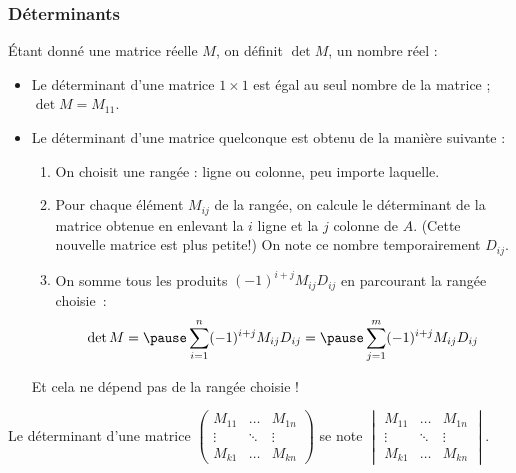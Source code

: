 \subsubsection{Déterminants}
\begin{frame}
  Étant donné une matrice réelle \(M\), on définit \(\det M\), un nombre réel :\pause
    \begin{definition}
    \begin{itemize}
    \item Le déterminant d'une matrice \(1\times 1\) est égal au seul nombre de la matrice ; \(\det M = M_{11}\).\pause{}
    \item Le déterminant d'une matrice quelconque est obtenu de la manière suivante :\pause{}
      \begin{enumerate}[<+->]
      \item On choisit une rangée : ligne ou colonne, peu importe laquelle.
      \item Pour chaque élément \(M_{ij}\) de la rangée, on calcule le déterminant de la matrice obtenue en enlevant la \(i\)\ieme{} ligne et la \(j\)\ieme{} colonne de \(A\). (Cette nouvelle matrice est plus petite!) On note ce nombre temporairement \(D_{ij}\).
      \item On somme tous les produits \((-1)^{i+j} M_{ij} D_{ij}\) en parcourant la rangée choisie~:\pause{}
        \begin{equation*}
          \det M =\pause \sum_{i=1}^{n} (-1)^{i+j} M_{ij} D_{ij} 
          =\pause \sum_{j=1}^{m} (-1)^{i+j} M_{ij} D_{ij}
        \end{equation*}
      \end{enumerate}\pause{}
        Et cela ne dépend pas de la rangée choisie !
    \end{itemize}
  \end{definition}
\end{frame}
\begin{frame}
  \begin{definition}
    Le déterminant d'une matrice
    \begin{math}
      \begin{pmatrix}
        M_{11} & \ldots & M_{1n} \\
        \vdots    & \ddots & \vdots    \\
        M_{k1} & \ldots & M_{kn}
      \end{pmatrix}
    \end{math}
    se note
    \begin{math}
      \begin{vmatrix}
        M_{11} & \ldots & M_{1n} \\
        \vdots    & \ddots & \vdots    \\
        M_{k1} & \ldots & M_{kn}
      \end{vmatrix}.
    \end{math}
  \end{definition}
\end{frame}

